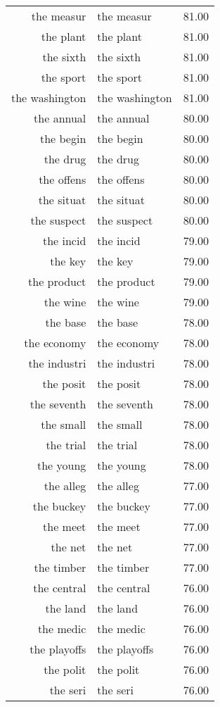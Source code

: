 \begin{table}[ht]
\begin{tabular}{rlr}
  the measur & the measur & 81.00 \\ 
  the plant & the plant & 81.00 \\ 
  the sixth & the sixth & 81.00 \\ 
  the sport & the sport & 81.00 \\ 
  the washington & the washington & 81.00 \\ 
  the annual & the annual & 80.00 \\ 
  the begin & the begin & 80.00 \\ 
  the drug & the drug & 80.00 \\ 
  the offens & the offens & 80.00 \\ 
  the situat & the situat & 80.00 \\ 
  the suspect & the suspect & 80.00 \\ 
  the incid & the incid & 79.00 \\ 
  the key & the key & 79.00 \\ 
  the product & the product & 79.00 \\ 
  the wine & the wine & 79.00 \\ 
  the base & the base & 78.00 \\ 
  the economy & the economy & 78.00 \\ 
  the industri & the industri & 78.00 \\ 
  the posit & the posit & 78.00 \\ 
  the seventh & the seventh & 78.00 \\ 
  the small & the small & 78.00 \\ 
  the trial & the trial & 78.00 \\ 
  the young & the young & 78.00 \\ 
  the alleg & the alleg & 77.00 \\ 
  the buckey & the buckey & 77.00 \\ 
  the meet & the meet & 77.00 \\ 
  the net & the net & 77.00 \\ 
  the timber & the timber & 77.00 \\ 
  the central & the central & 76.00 \\ 
  the land & the land & 76.00 \\ 
  the medic & the medic & 76.00 \\ 
  the playoffs & the playoffs & 76.00 \\ 
  the polit & the polit & 76.00 \\ 
  the seri & the seri & 76.00 \\ 

\end{tabular}
\end{table}
